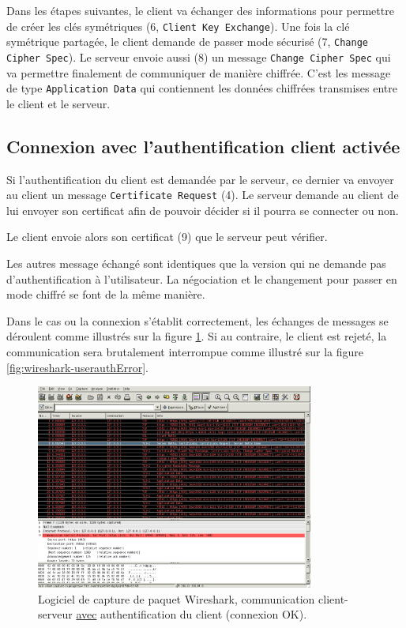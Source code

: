 \documentclass[10pt,a4paper,titlepage]{article}
\begin{document}
Dans les étapes suivantes, le client va échanger des informations pour permettre de créer les clés symétriques (6, \texttt{Client Key Exchange}). Une fois la clé symétrique partagée, le client demande de passer mode sécurisé (7, \texttt{Change Cipher Spec}). Le serveur envoie aussi (8) un message \texttt{Change Cipher Spec} qui va permettre finalement de communiquer de manière chiffrée. C'est les message de type \texttt{Application Data} qui contiennent les données chiffrées transmises entre le client et le serveur.

\subsection{Connexion avec l'authentification client activée}

Si l'authentification du client est demandée par le serveur, ce dernier va envoyer au client un message \texttt{Certificate Request} (4). Le serveur demande au client de lui envoyer son certificat afin de pouvoir décider si il pourra se connecter ou non.

Le client envoie alors son certificat (9) que le serveur peut vérifier. 

Les autres message échangé sont identiques que la version qui ne demande pas d'authentification à l'utilisateur. La négociation et le changement pour passer en mode chiffré se font de la même manière.

Dans le cas ou la connexion s'établit correctement, les échanges de messages se déroulent comme illustrés sur la figure \ref{fig:wireshark-userauthOk}. Si au contraire, le client est rejeté, la communication sera brutalement interrompue comme illustré sur la figure \ref{fig:wireshark-userauthError}.

\begin{figure}[htbp]
   \begin{center}
      \includegraphics[width=345px]{img/wireshark-with-auth-OK.png}
   \end{center}
   \caption{Logiciel de capture de paquet Wireshark, communication client-serveur \underline{avec} authentification du client (connexion OK).}
	\label{fig:wireshark-userauthOk}
\end{figure}
\end{document}
